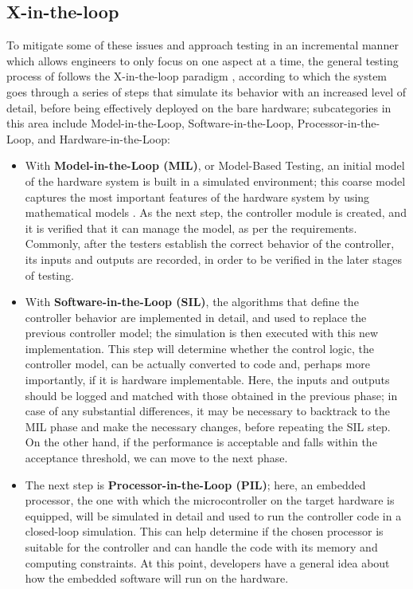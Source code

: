 \subsection{X-in-the-loop}
To mitigate some of these issues and approach \es testing in an incremental manner which allows engineers to only focus on one aspect at a time, the general testing process of \ess follows the X-in-the-loop paradigm \cite{DBLP:journals/software/GarousiFKY18}, according to which the system goes through a series of steps that simulate its behavior with an increased level of detail, before being effectively deployed on the bare hardware; subcategories in this area include Model-in-the-Loop, Software-in-the-Loop, Processor-in-the-Loop, and Hardware-in-the-Loop:
\begin{itemize}
    \item With \textbf{Model-in-the-Loop (MIL)}, or Model-Based Testing, an initial model of the hardware system is built in a simulated environment; this coarse model captures the most important features of the hardware system by using mathematical models \cite{XLoop}. As the next step, the controller module is created, and it is verified that it can manage the model, as per the requirements. Commonly, after the testers establish the correct behavior of the controller, its inputs and outputs are recorded, in order to be verified in the later stages of testing.
    \item With \textbf{Software-in-the-Loop (SIL)}, the algorithms that define the controller behavior are implemented in detail, and used to replace the previous controller model; the simulation is then executed with this new implementation. This step will determine whether the control logic, \ie the controller model, can be actually converted to code and, perhaps more importantly, if it is hardware implementable. Here, the inputs and outputs should be logged and matched with those obtained in the previous phase; in case of any substantial differences, it may be necessary to backtrack to the MIL phase and make the necessary changes, before repeating the SIL step. On the other hand, if the performance is acceptable and falls within the acceptance threshold, we can move to the next phase.
    \item The next step is \textbf{Processor-in-the-Loop (PIL)}; here, an embedded processor, the one with which the microcontroller on the target hardware is equipped, will be simulated in detail and used to run the controller code in a closed-loop simulation. This can help determine if the chosen processor is suitable for the controller and can handle the code with its memory and computing constraints. At this point, developers have a general idea about how the embedded software will run on the hardware.

\end{itemize}
